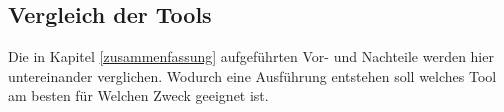 \subsection{Vergleich der Tools}\label{vergleich}

Die in Kapitel \ref{zusammenfassung} aufgeführten Vor- und Nachteile werden hier
untereinander verglichen. Wodurch eine Ausführung entstehen soll welches Tool
am besten für Welchen Zweck geeignet ist.
